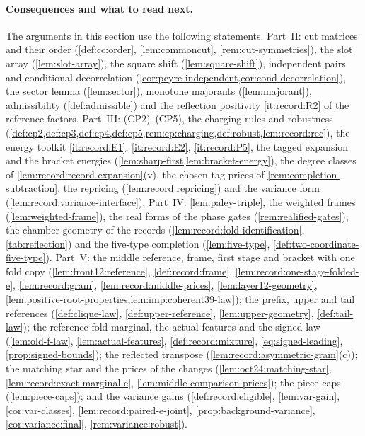 \paragraph{Consequences and what to read next.}
The arguments in this section use the following statements. Part~II: cut matrices and their order (\cref{def:cc:order}, \cref{lem:commoncut},
\cref{rem:cut-symmetries}), the slot array (\cref{lem:slot-array}), the square shift
(\cref{lem:square-shift}), independent pairs and conditional decorrelation
(\cref{cor:peyre-independent,cor:cond-decorrelation}), the sector lemma
(\cref{lem:sector}), monotone majorants (\cref{lem:majorant}), admissibility
(\cref{def:admissible}) and the reflection positivity \ref{it:record:R2} of the
reference factors. Part~III: (CP2)--(CP5), the charging rules and robustness
(\cref{def:cp2,def:cp3,def:cp4,def:cp5,rem:cp:charging,def:robust,lem:record:rec}), the
energy toolkit \ref{it:record:E1}, \ref{it:record:E2}, \ref{it:record:P5}, the tagged
expansion and the bracket energies (\cref{lem:sharp-first,lem:bracket-energy}), the
degree classes of \cref{lem:record:record-expansion}(v), the chosen tag prices of
\cref{rem:completion-subtraction}, the repricing (\cref{lem:record:repricing}) and the
variance form (\cref{lem:record:variance-interface}). Part~IV: \cref{lem:paley-triple},
the weighted frames (\cref{lem:weighted-frame}), the real forms of the phase gates
(\cref{rem:realified-gates}), the chamber geometry of the records
(\cref{lem:record:fold-identification}, \cref{tab:reflection}) and the five-type completion
(\cref{lem:five-type}, \cref{def:two-coordinate-five-type}). Part~V: the middle reference,
frame, first stage and bracket with one fold copy (\cref{lem:front12:reference},
\cref{def:record:frame}, \cref{lem:record:one-stage-folded-e}, \cref{lem:record:gram},
\cref{lem:record:middle-prices}, \cref{lem:layer12-geometry},
\cref{lem:positive-root-properties,lem:imp:coherent39-law});
the prefix, upper and tail references (\cref{def:clique-law}, \cref{def:upper-reference},
\cref{lem:upper-geometry}, \cref{def:tail-law}); the reference fold marginal, the actual
features and the signed law (\cref{lem:old-f-law}, \cref{lem:actual-features},
\cref{def:record:mixture}, \eqref{eq:signed-leading}, \cref{prop:signed-bounds}); the
reflected transpose (\cref{lem:record:asymmetric-gram}(c)); the matching star and the
prices of the changes (\cref{lem:oct24:matching-star}, \cref{lem:record:exact-marginal-e},
\cref{lem:middle-comparison-prices}); the piece caps (\cref{lem:piece-caps}); and the variance gains
(\cref{def:record:eligible}, \cref{lem:var-gain}, \cref{cor:var-classes},
\cref{lem:record:paired-e-joint}, \cref{prop:background-variance},
\cref{cor:variance:final}, \cref{rem:variance:robust}).

